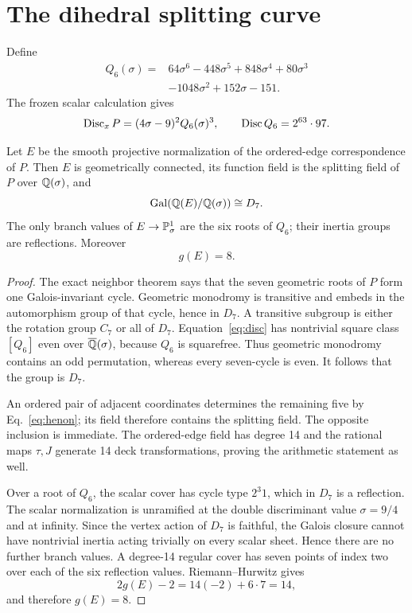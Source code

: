\section{The dihedral splitting curve}\label{sec:geometry}

Define
\begin{equation}\label{eq:q6}
\begin{split}
Q_6(\sigma)={}&64\sigma^6-448\sigma^5+848\sigma^4+80\sigma^3\\
&-1048\sigma^2+152\sigma-151.
\end{split}
\end{equation}
The frozen scalar calculation gives
\begin{equation}\label{eq:disc}
 \operatorname{Disc}_xP=(4\sigma-9)^2Q_6(\sigma)^3,
 \qquad \operatorname{Disc} Q_6=2^{63}\cdot97.
\end{equation}

\begin{theorem}\label{thm:d7}
Let $E$ be the smooth projective normalization of the ordered-edge
correspondence of $P$.  Then $E$ is geometrically connected, its function
field is the splitting field of $P$ over $\mathbb Q(\sigma)$, and
\[
 \operatorname{Gal}(\mathbb Q(E)/\mathbb Q(\sigma))\cong D_7.
\]
The only branch values of $E\to\mathbb P^1_\sigma$ are the six roots of $Q_6$;
their inertia groups are reflections.  Moreover
\[
 \boxed{g(E)=8}.
\]
\end{theorem}

\begin{proof}
The exact neighbor theorem says that the seven geometric roots of $P$ form
one Galois-invariant cycle.  Geometric monodromy is transitive and embeds in
the automorphism group of that cycle, hence in $D_7$.  A transitive subgroup
is either the rotation group $C_7$ or all of $D_7$.  Equation~\eqref{eq:disc}
has nontrivial square class $[Q_6]$ even over
$\overline{\mathbb Q}(\sigma)$, because $Q_6$ is squarefree.  Thus geometric
monodromy contains an odd permutation, whereas every seven-cycle is even.
It follows that the group is $D_7$.

An ordered pair of adjacent coordinates determines the remaining five by
Eq.~\eqref{eq:henon}; its field therefore contains the splitting field.  The
opposite inclusion is immediate.  The ordered-edge field has degree 14 and
the rational maps $\tau,J$ generate 14 deck transformations, proving the
arithmetic statement as well.

Over a root of $Q_6$, the scalar cover has cycle type $2^3 1$, which in
$D_7$ is a reflection.  The scalar normalization is unramified at the
double discriminant value $\sigma=9/4$ and at infinity.  Since the vertex
action of $D_7$ is faithful, the Galois closure cannot have nontrivial inertia
acting trivially on every scalar sheet.  Hence there are no further branch
values.  A degree-14 regular cover has seven points of index two over each of
the six reflection values.  Riemann--Hurwitz gives
\[
 2g(E)-2=14(-2)+6\cdot7=14,
\]
and therefore $g(E)=8$.
\end{proof}

